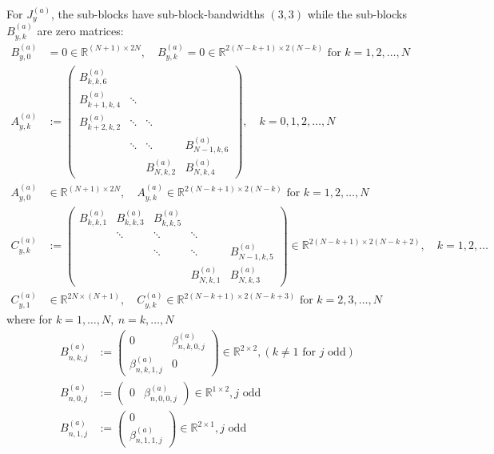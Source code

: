 \documentclass[11pt, oneside]{article}   	%
\newcommand{\R}{\mathbb{R}}
\newcommand{\betaa}{\beta^{(a)}}
\begin{document}
For $J_y^{(a)}$, the sub-blocks have sub-block-bandwidths $(3,3)$ while the sub-blocks $B^{(a)}_{y,k}$ are zero matrices:
\begin{align*}
	B^{(a)}_{y,0} &= 0 \in \R^{(N+1)\times2N}, \quad B^{(a)}_{y,k} = 0 \in \R^{2(N-k+1)\times2(N-k)} \text{ for } k = 1,2,\dots,N \\
	A^{(a)}_{y,k} &:= 
		\begin{pmatrix}
			B^{(a)}_{k,k,6} & & & \\
			B^{(a)}_{k+1,k,4} & \ddots & & \\
			B^{(a)}_{k+2,k,2} & \ddots & \ddots & \\
			& \ddots & \ddots & B^{(a)}_{N-1,k,6} \\
			& & B^{(a)}_{N,k,2} & B^{(a)}_{N,k,4}
		\end{pmatrix}, \quad k = 0,1,2,\dots,N \\
	A^{(a)}_{y,0} &\in \R^{(N+1)\times2N}, \quad A^{(a)}_{y,k} \in \R^{2(N-k+1)\times2(N-k)} \text{ for } k = 1,2,\dots,N \\
	C^{(a)}_{y,k} &:= 
		\begin{pmatrix}
			B^{(a)}_{k,k,1} & B^{(a)}_{k,k,3} & B^{(a)}_{k,k,5} & & \\
			& \ddots & \ddots & \ddots \\
			& & \ddots & \ddots & B^{(a)}_{N-1,k,5} \\
			& & & B^{(a)}_{N,k,1} & B^{(a)}_{N,k,3}
		\end{pmatrix} \in \R^{2(N-k+1)\times2(N-k+2)}, \quad k = 1,2,\dots \\
	C^{(a)}_{y,1} &\in \R^{2N\times(N+1)}, \quad C^{(a)}_{y,k} \in \R^{2(N-k+1)\times2(N-k+3)} \text{ for } k = 2,3,\dots,N
\end{align*}
where for $k = 1,\dots,N, \: n = k,\dots,N$
\begin{align*}
	B^{(a)}_{n,k,j} &:= 
		\begin{pmatrix}
			0 & \betaa_{n,k,0,j} \\
			\betaa_{n,k,1,j} & 0
		\end{pmatrix} \in \R^{2\times2}, (k \ne 1 \text { for } j \text{ odd}) \\
	B^{(a)}_{n,0,j} &:=
		\begin{pmatrix}
			0 & \betaa_{n,0,0,j}
		\end{pmatrix} \in \R^{1\times2}, j \text{ odd} \\
	B^{(a)}_{n,1,j} &:=
		\begin{pmatrix}
			0 \\
			\betaa_{n,1,1,j}
		\end{pmatrix}\in \R^{2\times1}, j \text{ odd} \\
\end{align*}
\end{document}
